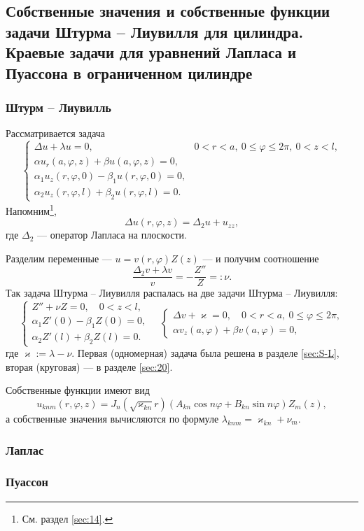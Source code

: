 \subsection{Собственные значения и собственные функции задачи Штурма -- Лиувилля для цилиндра. Краевые задачи для уравнений Лапласа и Пуассона в ограниченном цилиндре}
\subsubsection{Штурм -- Лиувилль}
Рассматривается задача 
\[
  \begin{cases}
    \Delta u + \lambda u = 0, & 0 < r < a, \ 0\leqslant \varphi \leqslant 2\pi,
    \ 0 < z < l,\\
    \alpha u_r(a, \varphi, z) + \beta u(a, \varphi, z) = 0,\\
    \alpha_1 u_z(r,\varphi, 0) - \beta_1 u(r,\varphi, 0) = 0,\\
    \alpha_2 u_z(r,\varphi, l) + \beta_2 u(r,\varphi, l) = 0.
  \end{cases}
\]
Напомним\footnote{См. раздел \ref{sec:14}.}, 
\[
  \Delta u(r,\varphi,z) = \Delta_2 u + u_{zz},
\]
где $ \Delta_2 $ --- оператор Лапласа на плоскости.

Разделим переменные --- $ u = v(r, \varphi) Z(z) $ --- и получим соотношение 
\[
    \frac{\Delta_2 v + \lambda v}{v} = - \frac{Z''}{Z} =: \nu.
\]
Так задача Штурма -- Лиувилля распалась на две задачи Штурма -- Лиувилля: 
\[
  \begin{cases}
    Z'' + \nu Z = 0, \quad 0 < z < l,\\
    \alpha_1Z'(0) -\beta_1 Z(0) = 0,\\
    \alpha_2 Z'(l) + \beta_2 Z(l) = 0.
  \end{cases}\quad
  \begin{cases}
    \Delta v + \varkappa = 0, \quad 0 < r < a, \ 0 \leqslant \varphi \leqslant
    2\pi,\\
    \alpha v_z(a,\varphi) + \beta v(a,\varphi) = 0,
  \end{cases}
\]
где $ \varkappa := \lambda - \nu $. Первая (одномерная) задача была решена в
разделе \ref{sec:S-L}, вторая (круговая) --- в разделе \ref{sec:20}. 

Собственные функции имеют вид 
\[
  u_{knm}(r, \varphi, z) = J_n \left( \sqrt{\varkappa_{kn}}r \right) (A_{kn}
\cos n\varphi + B_{kn} \sin n\varphi) Z_m(z),
\]
а собственные значения вычисляются по формуле $ \lambda_{knm} = \varkappa_{kn} +
\nu_m$.



\subsubsection{Лаплас}



\subsubsection{Пуассон}

